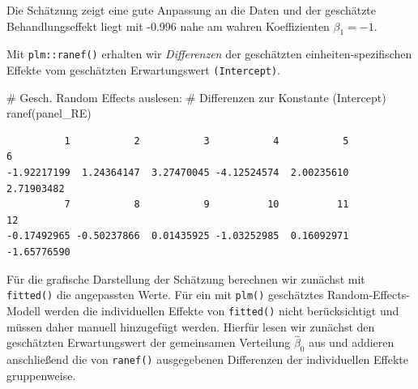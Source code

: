 \documentclass[
  a4paper,
  DIV=11,
  oneside]{scrreprt}
\newenvironment{Shaded}{\begin{snugshade}}{\end{snugshade}}
\newcommand{\AttributeTok}[1]{\textcolor[rgb]{0.40,0.45,0.13}{#1}}
\newcommand{\CommentTok}[1]{\textcolor[rgb]{0.37,0.37,0.37}{#1}}
\newcommand{\DecValTok}[1]{\textcolor[rgb]{0.68,0.00,0.00}{#1}}
\newcommand{\FunctionTok}[1]{\textcolor[rgb]{0.28,0.35,0.67}{#1}}
\newcommand{\NormalTok}[1]{\textcolor[rgb]{0.00,0.23,0.31}{#1}}
\newcommand{\OtherTok}[1]{\textcolor[rgb]{0.00,0.23,0.31}{#1}}
\newcommand{\SpecialCharTok}[1]{\textcolor[rgb]{0.37,0.37,0.37}{#1}}
\begin{document}
Die Schätzung zeigt eine gute Anpassung an die Daten und der geschätzte
Behandlungseffekt liegt mit -0.996 nahe am wahren Koeffizienten
\(\beta_1 = -1\).

Mit \texttt{plm::ranef()} erhalten wir \emph{Differenzen} der
geschätzten einheiten-spezifischen Effekte vom geschätzten
Erwartungswert \texttt{(Intercept)}.

\begin{Shaded}
\begin{Highlighting}[]
\CommentTok{\# Gesch. Random Effects auslesen:}
\CommentTok{\# Differenzen zur Konstante (Intercept)}
\FunctionTok{ranef}\NormalTok{(panel\_RE)}
\end{Highlighting}
\end{Shaded}

\begin{verbatim}
          1           2           3           4           5           6 
-1.92217199  1.24364147  3.27470045 -4.12524574  2.00235610  2.71903482 
          7           8           9          10          11          12 
-0.17492965 -0.50237866  0.01435925 -1.03252985  0.16092971 -1.65776590 
\end{verbatim}

Für die grafische Darstellung der Schätzung berechnen wir zunächst mit
\texttt{fitted()} die angepassten Werte. Für ein mit \texttt{plm()}
geschätztes Random-Effects-Modell werden die individuellen Effekte von
\texttt{fitted()} nicht berücksichtigt und müssen daher manuell
hinzugefügt werden. Hierfür lesen wir zunächst den geschätzten
Erwartungswert der gemeinsamen Verteilung \(\widehat{\beta}_0\) aus und
addieren anschließend die von \texttt{ranef()} ausgegebenen Differenzen
der individuellen Effekte gruppenweise.

\begin{Shaded}
\end{Shaded}
\end{document}
